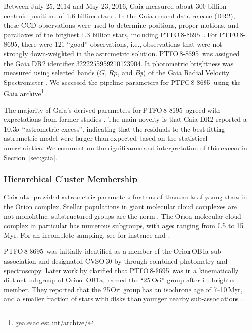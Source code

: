 \documentclass[12pt,twocolumn,tighten]{aastex62}
\newcommand{\ptfo}{PTFO$\,$8-8695}
\begin{document}
Between July 25, 2014 and May 23, 2016, Gaia measured about 300
billion centroid positions of 1{.}6 billion stars
\citep{gaia_collaboration_gaia_2016,lindegren_gaiasoln_2018,gaia_collaboration_gaia_2018}.
In the Gaia second data release (DR2), these CCD observations were
used to determine positions, proper motions, and parallaxes of the
brighest 1{.}3 billion stars, including \ptfo\
\citep{lindegren_gaiasoln_2018}.  For \ptfo, there were 121 ``good'' observations, i.e., observations that were not strongly down-weighted in
the astrometric solution.  \ptfo\ was assigned the Gaia DR2 identifier
3222255959210123904.  It photometric brightness was measured using
selected bands ($G$, $Rp$, and $Bp$) of the Gaia Radial Velocity
Spectrometer \citep{cropper_gaia_2018,evans_gaia_2018}.  We accessed
the pipeline parameters for \ptfo\ using the Gaia
archive\footnote{\url{gea.esac.esa.int/archive/}}.

The majority of Gaia's derived parameters for \ptfo\ agreed with
expectations from former studies
\citep{briceno_cida_2005,van_eyken_ptf_2012}.  The main novelty is
that Gaia DR2 reported a 10.3$\sigma$ ``astrometric excess'', indicating
that the residuals to the best-fitting astrometric model were larger
than expected based on the statistical uncertainties.
We comment on the significance and
interpretation of this excess in Section~\ref{sec:gaia}.


\subsubsection{Hierarchical Cluster Membership}
\label{subsec:hierarchical}

Gaia also provided astrometric parameters for tens of thousands of
young stars in the Orion complex.  Stellar populations in giant
molecular cloud complexes are not monolithic; substructured groups are
the norm \citep{briceno_lowmassOB_2007}.  The Orion molecular cloud
complex in particular has numerous subgroups, with ages ranging from 0.5
to 15$\,$Myr. For an incomplete sampling, see for instance
\citet{briceno_cida_2005,jeffries_kinematic_2006,briceno_25_2007,kounkel_apogee2_2018}
and \citet{briceno_cidaII_2019}.

\ptfo\ was initially identified as a member of the Orion$\,$OB1a
sub-association and designated CVSO\,30 by \citet{briceno_cida_2005} through combined
photometry and spectroscopy.  Later work by \citet{briceno_25_2007}
clarified that \ptfo\ was in a kinematically distinct subgroup of
Orion~OB1a, named the ``25$\,$Ori'' group after its brightest
member. They reported that the 25$\,$Ori group has an isochrone age of 7--10$\,$Myr, and
a smaller fraction of stars with disks than younger nearby sub-associations
\citep{hernandez_spitzer_ob1_2007}.
\end{document}
